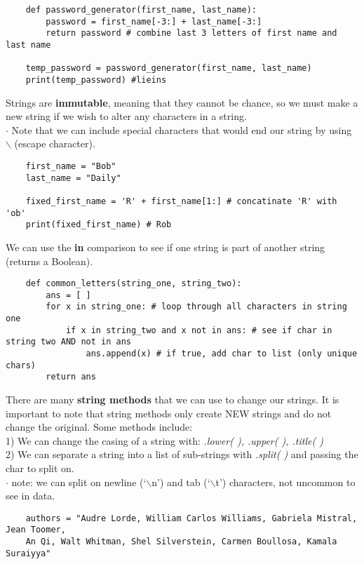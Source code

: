 \documentclass[11pt, a4paper]{article}
\begin{document}
\begin{spacing}{1.1}
\begin{lstlisting}
	def password_generator(first_name, last_name):
		password = first_name[-3:] + last_name[-3:]
		return password # combine last 3 letters of first name and last name
	
	temp_password = password_generator(first_name, last_name)
	print(temp_password) #lieins \end{lstlisting}\vspace*{1mm}
	Strings are \textbf{immutable}, meaning that they cannot be chance, so we must make a new string if we wish to alter any characters in a string. \\
	\hspace*{1.5mm} $\cdot$ Note that we can include special characters that would end our string by using $\backslash$ (escape character).
	\begin{lstlisting}
	first_name = "Bob"
	last_name = "Daily"
	
	fixed_first_name = 'R' + first_name[1:] # concatinate 'R' with 'ob'
	print(fixed_first_name) # Rob \end{lstlisting}\vspace*{1mm}
	We can use the \textbf{in} comparison to see if one string is part of another string (returns a Boolean). 
	\begin{lstlisting}
	def common_letters(string_one, string_two):
		ans = [ ]
		for x in string_one: # loop through all characters in string one
			if x in string_two and x not in ans: # see if char in string two AND not in ans
				ans.append(x) # if true, add char to list (only unique chars)
		return ans \end{lstlisting}\vspace*{1mm}
	There are many \textbf{string methods} that we can use to change our strings. It is important to note that string methods only create NEW strings and do not change the original. Some methods include: \\
	\hspace*{1.5mm} 1) We can change the casing of a string with: \textit{.lower( ), .upper( ), .title( )} \\
	\hspace*{1.5mm} 2) We can separate a string into a list of sub-strings with \textit{.split( )} and passing the char to split on. \\
	\hspace*{6mm} $\cdot$ note: we can split on newline (`$\backslash$n') and tab (`$\backslash$t') characters, not uncommon to see in data.
	\begin{lstlisting}
	authors = "Audre Lorde, William Carlos Williams, Gabriela Mistral, Jean Toomer, 
	An Qi, Walt Whitman, Shel Silverstein, Carmen Boullosa, Kamala Suraiyya"
	

\end{lstlisting}
\end{spacing}
\end{document}
